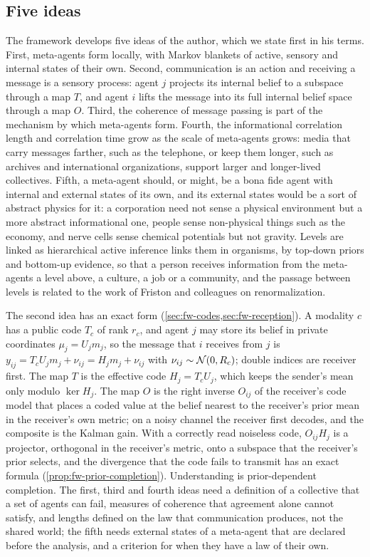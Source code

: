 \subsection{Five ideas}\label{sec:int-ideas}

The framework develops five ideas of the author, which we state first in his terms. First, meta-agents form locally, with Markov blankets of active, sensory and internal states of their own. Second, communication is an action and receiving a message is a sensory process: agent $j$ projects its internal belief to a subspace through a map $T$, and agent $i$ lifts the message into its full internal belief space through a map $O$. Third, the coherence of message passing is part of the mechanism by which meta-agents form. Fourth, the informational correlation length and correlation time grow as the scale of meta-agents grows: media that carry messages farther, such as the telephone, or keep them longer, such as archives and international organizations, support larger and longer-lived collectives. Fifth, a meta-agent should, or might, be a bona fide agent with internal and external states of its own, and its external states would be a sort of abstract physics for it: a corporation need not sense a physical environment but a more abstract informational one, people sense non-physical things such as the economy, and nerve cells sense chemical potentials but not gravity. Levels are linked as hierarchical active inference links them in organisms, by top-down priors and bottom-up evidence, so that a person receives information from the meta-agents a level above, a culture, a job or a community, and the passage between levels is related to the work of Friston and colleagues on renormalization.

The second idea has an exact form (\cref{sec:fw-codes,sec:fw-reception}). A modality $c$ has a public code $T_c$ of rank $r_c$, and agent $j$ may store its belief in private coordinates $\mu_j=U_jm_j$, so the message that $i$ receives from $j$ is $y_{ij}=T_cU_jm_j+\nu_{ij}=H_jm_j+\nu_{ij}$ with $\nu_{ij}\sim\mathcal{N}(0,R_c)$; double indices are receiver first. The map $T$ is the effective code $H_j=T_cU_j$, which keeps the sender's mean only modulo $\ker H_j$. The map $O$ is the right inverse $O_{ij}$ of the receiver's code model that places a coded value at the belief nearest to the receiver's prior mean in the receiver's own metric; on a noisy channel the receiver first decodes, and the composite is the Kalman gain. With a correctly read noiseless code, $O_{ij}H_j$ is a projector, orthogonal in the receiver's metric, onto a subspace that the receiver's prior selects, and the divergence that the code fails to transmit has an exact formula (\cref{prop:fw-prior-completion}). Understanding is prior-dependent completion. The first, third and fourth ideas need a definition of a collective that a set of agents can fail, measures of coherence that agreement alone cannot satisfy, and lengths defined on the law that communication produces, not the shared world; the fifth needs external states of a meta-agent that are declared before the analysis, and a criterion for when they have a law of their own.

